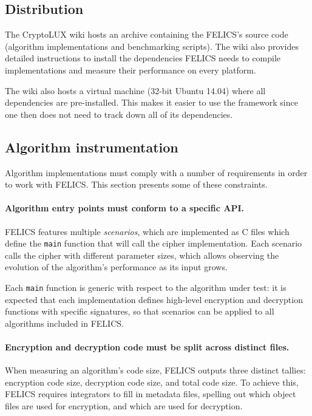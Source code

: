 \documentclass{article}
\begin{document}
\subsection{Distribution}
\label{sec:felics/dist}

The CryptoLUX wiki\cite{FELICS:wiki} hosts an archive containing the
FELICS's source code (algorithm implementations and benchmarking
scripts).  The wiki also provides detailed instructions to install the
dependencies FELICS needs to compile implementations and measure their
performance on every platform.

The wiki also hosts a virtual machine (32-bit Ubuntu 14.04) where all
dependencies are pre-installed.  This makes it easier to use the
framework since one then does not need to track down all of its
dependencies.

\subsection{Algorithm instrumentation}
\label{sec:felics/adding-algos}

Algorithm implementations must comply with a number of requirements in
order to work with FELICS.  This section presents some of these
constraints.

\paragraph{Algorithm entry points must conform to a specific API.}

FELICS features multiple \emph{scenarios}, which are implemented as C
files which define the \texttt{main} function that will call the
cipher implementation.  Each scenario calls the cipher with different
parameter sizes, which allows observing the evolution of the
algorithm's performance as its input grows.

Each \texttt{main} function is generic with respect to the algorithm
under test: it is expected that each implementation defines high-level
encryption and decryption functions with specific signatures, so that
scenarios can be applied to all algorithms included in FELICS.

\paragraph{Encryption and decryption code must be split across
  distinct files.}

When measuring an algorithm's code size, FELICS outputs three distinct
tallies: encryption code size, decryption code size, and total code
size.  To achieve this, FELICS requires integrators to fill in
metadata files, spelling out which object files are used for
encryption, and which are used for decryption.
\end{document}
